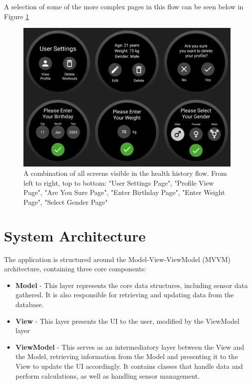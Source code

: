 \documentclass{l4proj}
\begin{document}
A selection of some of the more complex pages in this flow can be seen below in Figure \ref{fig:usersettingsdesign}

\begin{figure}[h!]
    \centering
    \includegraphics[width=0.88\linewidth]{dissertation//dissImages/UserSettingsCombined.png}
    \caption{A combination of all screens visible in the health history flow. From left to right, top to bottom: "User Settings Page", "Profile View Page", "Are You Sure Page", "Enter Birthday Page", "Enter Weight Page", "Select Gender Page"}
    \label{fig:usersettingsdesign}
\end{figure}

\section{System Architecture}
\label{sec:systemarch}

The application is structured around the Model-View-ViewModel (MVVM) architecture, containing three core components:

\begin{itemize}
    \item \textbf{Model} - This layer represents the core data structures, including sensor data gathered. It is also responsible for retrieving and updating data from the database.
    \item \textbf{View} - This layer presents the UI to the user, modified by the ViewModel layer
    \item \textbf{ViewModel} - This serves as an intermediatory layer between the View and the Model, retrieving information from the Model and presenting it to the View to update the UI accordingly. It contains classes that handle data and perform calculations, as well as handling sensor management.
\end{itemize}
\end{document}

